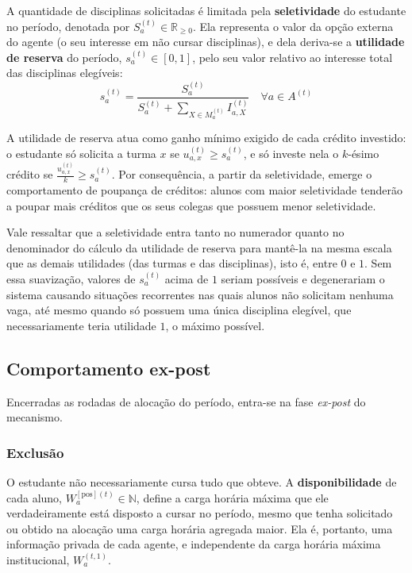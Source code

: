 \documentclass[
    12pt,
    openany,
    oneside,
    a4paper,
    english,
    brazil
]{abntex2}
\begin{document}
A quantidade de disciplinas solicitadas é limitada pela \textbf{seletividade} do estudante no período, denotada por $S_a^{(t)} \in \mathbb{R}_{\geq 0}$. Ela representa o valor da opção externa do agente (o seu interesse em não cursar disciplinas), e dela deriva-se a \textbf{utilidade de reserva}\cite{???} do período, $s_a^{(t)} \in [0, 1]$, pelo seu valor relativo ao interesse total das disciplinas elegíveis:
\begin{equation}
    s_a^{(t)} = \frac{S_a^{(t)}}{S_a^{(t)} + \sum_{X \in M_a^{(t)}} I_{a, X}^{(t)}}
    \quad \forall a \in A^{(t)}
\end{equation}

A utilidade de reserva atua como ganho mínimo exigido de cada crédito investido: o estudante só solicita a turma $x$ se $u_{a, x}^{(t)} \geq s_a^{(t)}$, e só investe nela o $k$-ésimo crédito se $\frac{u_{a, x}^{(t)}}{k} \geq s_a^{(t)}$. Por consequência, a partir da seletividade, emerge o comportamento de poupança de créditos: alunos com maior seletividade tenderão a poupar mais créditos que os seus colegas que possuem menor seletividade.

Vale ressaltar que a seletividade entra tanto no numerador quanto no denominador do cálculo da utilidade de reserva para mantê-la na mesma escala que as demais utilidades (das turmas e das disciplinas), isto é, entre $0$ e $1$. Sem essa suavização, valores de $s_a^{(t)}$ acima de $1$ seriam possíveis e degenerariam o sistema causando situações recorrentes nas quais alunos não solicitam nenhuma vaga, até mesmo quando só possuem uma única disciplina elegível, que necessariamente teria utilidade $1$, o máximo possível.

\subsection{Comportamento ex-post}

Encerradas as rodadas de alocação do período, entra-se na fase \textit{ex-post} do mecanismo. 

\subsubsection{Exclusão}
O estudante não necessariamente cursa tudo que obteve. A \textbf{disponibilidade} de cada aluno, $W_a^{[\text{pos}](t)} \in \mathbb{N}$, define a carga horária máxima que ele verdadeiramente está disposto a cursar no período, mesmo que tenha solicitado ou obtido na alocação uma carga horária agregada maior. Ela é, portanto, uma informação privada de cada agente, e independente da carga horária máxima institucional, $W_a^{(t, 1)}$.
\end{document}
